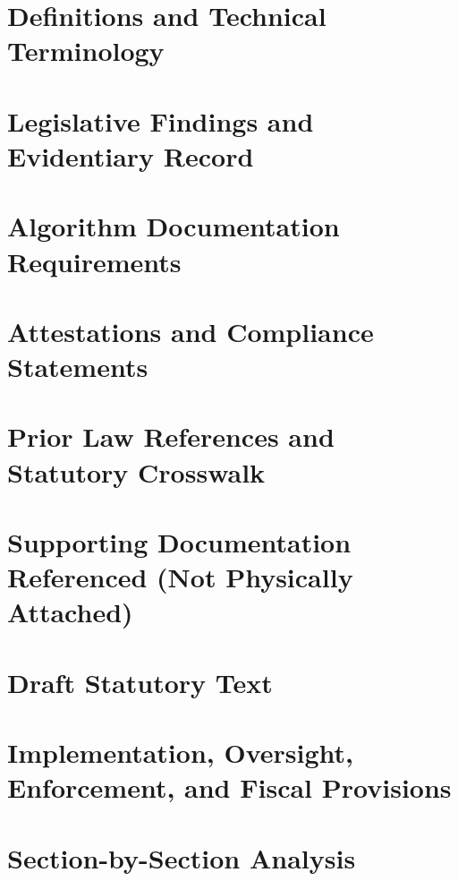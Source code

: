 \documentclass[11pt]{article}
\begin{document}
\section{Definitions and Technical Terminology}
\label{sec:definitions}


\section{Legislative Findings and Evidentiary Record}
\label{sec:findings}


\section{Algorithm Documentation Requirements}
\label{sec:algorithm_documentation}


\section{Attestations and Compliance Statements}
\label{sec:attestations_compliance}


\section{Prior Law References and Statutory Crosswalk}
\label{sec:prior_law}


\section{Supporting Documentation Referenced (Not Physically Attached)}
\label{sec:supporting_documentation}


\section{Draft Statutory Text}
\label{sec:statutory_text}


\section{Implementation, Oversight, Enforcement, and Fiscal Provisions}
\label{sec:implementation_enforcement}


\section{Section-by-Section Analysis}
\label{sec:section_by_section}

\end{document}
